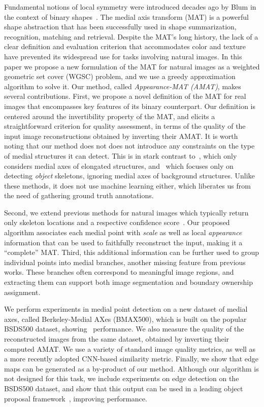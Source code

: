 \documentclass[10pt,twocolumn,letterpaper]{article}
\begin{document}
Fundamental notions of local symmetry were introduced decades ago by Blum in the context 
of binary shapes~\cite{blum1967transformation,blum1973biological}.
The medial axis transform (MAT) is a powerful shape abstraction that has been successfully
used in shape summarization, recognition, matching and retrieval. 
Despite the MAT's long history, the lack of a clear definition and evaluation criterion 
that accommodates color and texture have prevented its widespread use for tasks involving natural images.
In this paper we propose a new formulation of the MAT for natural images as a 
weighted geometric set cover (WGSC) problem, and we use a greedy approximation algorithm to solve it.
Our method, called \emph{Appearance-MAT (AMAT)}, makes several contributions.
First, we propose a novel definition of the MAT for real images that encompasses key features of its 
binary counterpart. Our definition is centered around the invertibility property of the MAT, and elicits 
a straightforward criterion for quality assessment, in terms of the quality of the input image reconstructions
obtained by inverting their AMAT.
It is worth noting that our method does not does not introduce any constraints on the
type of medial structures it can detect.
This is in stark contrast to~\cite{tsogkas2012learning}, which only considers medial axes of elongated structures,
and~\cite{shen2016object} which focuses only on detecting \emph{object} skeletons, ignoring medial axes of 
background structures.
Unlike these methods, it does not use machine learning either, which liberates us from the need of gathering
ground truth annotations.

Second, we extend previous methods for natural images which typically return only skeleton 
locations and a respective confidence score~\cite{tsogkas2012learning,shen2016object}.
Our proposed algorithm associates each medial point with \emph{scale} as well as local \emph{appearance} information
that can be used to faithfully reconstruct the input, making it a ``complete'' MAT.
Third, this additional information can be further used to group individual points into medial branches,
another missing feature from previous works.
These branches often correspond to meaningful image regions, and extracting them can support both image segmentation
and boundary ownership assignment.

We perform experiments in medial point detection on a new dataset of medial axes, called
Berkeley-Medial AXes (BMAX500), which is built on the popular BSDS500 dataset, showing \sota\ performance.
We also measure the quality of the reconstructed images from the same dataset, obtained by inverting their computed AMAT. 
We use a variety of standard image quality metrics, as well as a more recently adopted CNN-based similarity metric.
Finally, we show that edge maps can be generated as a by-product of our method.
Although our algorithm is not designed for this task, we include experiments on edge detection on the BSDS500 dataset,
and show that this output can be used in a leading object proposal framework~\cite{zitnick2014edge},
improving performance.
\end{document}
